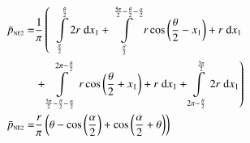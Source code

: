 \begin{align}
    \bar{p}_{\text{\tiny{NE2}}} =&\frac{1}{\pi} \left(\;\;\int\limits_{\frac{\pi}{2}}^{\frac{\theta}{2}}2 r\;\mathrm{d}x_{1}+\int\limits_{\frac{\theta}{2}}^{\frac{5 \pi}{2} - \frac{\theta}{2} - \frac{\alpha}{2}}r \cos{\left (\frac{\theta}{2} - x_{1} \right )} + r\;\mathrm{d}x_{1}\right.\notag\\
 &\left.+\int\limits_{\frac{5 \pi}{2} - \frac{\theta}{2} - \frac{\alpha}{2}}^{2 \pi - \frac{\theta}{2}}r \cos{\left (\frac{\theta}{2} + x_{1} \right )} + r\;\mathrm{d}x_{1}+\int\limits_{2 \pi - \frac{\theta}{2}}^{\frac{3 \pi}{2}}2 r\;\mathrm{d}x_{1}\right)\label{pNE2Def}\\
    \bar{p}_{\text{\tiny{NE2}}}  =& \frac{r}{\pi} \left(\theta - \cos{\left (\frac{\alpha}{2} \right )} + \cos{\left (\frac{\alpha}{2} + \theta \right )}\right)\label{pNE2Sln}
\end{align}